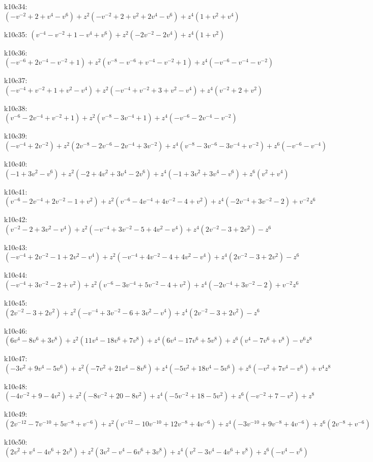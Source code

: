 k10c34: $ (-v^{-2}+2+v^{4}-v^{6})  +z^{2}(-v^{-2}+2+v^{2}+2v^{4}-v^{6})  +z^{4}(1+v^{2}+v^{4}) $ 

k10c35: $ (v^{-4}-v^{-2}+1-v^{4}+v^{6})  +z^{2}(-2v^{-2}-2v^{4})  +z^{4}(1+v^{2}) $ 

k10c36: $ (-v^{-6}+2v^{-4}-v^{-2}+1)  +z^{2}(v^{-8}-v^{-6}+v^{-4}-v^{-2}+1)  +z^{4}(-v^{-6}-v^{-4}-v^{-2}) $ 

k10c37: $ (-v^{-4}+v^{-2}+1+v^{2}-v^{4})  +z^{2}(-v^{-4}+v^{-2}+3+v^{2}-v^{4})  +z^{4}(v^{-2}+2+v^{2}) $ 

k10c38: $ (v^{-6}-2v^{-4}+v^{-2}+1)  +z^{2}(v^{-8}-3v^{-4}+1)  +z^{4}(-v^{-6}-2v^{-4}-v^{-2}) $ 

k10c39: $ (-v^{-4}+2v^{-2})  +z^{2}(2v^{-8}-2v^{-6}-2v^{-4}+3v^{-2})  +z^{4}(v^{-8}-3v^{-6}-3v^{-4}+v^{-2})  +z^{6}(-v^{-6}-v^{-4}) $ 

k10c40: $ (-1+3v^{2}-v^{6})  +z^{2}(-2+4v^{2}+3v^{4}-2v^{6})  +z^{4}(-1+3v^{2}+3v^{4}-v^{6})  +z^{6}(v^{2}+v^{4}) $ 

k10c41: $ (v^{-6}-2v^{-4}+2v^{-2}-1+v^{2})  +z^{2}(v^{-6}-4v^{-4}+4v^{-2}-4+v^{2})  +z^{4}(-2v^{-4}+3v^{-2}-2)  +v^{-2}z^{6} $ 

k10c42: $ (v^{-2}-2+3v^{2}-v^{4})  +z^{2}(-v^{-4}+3v^{-2}-5+4v^{2}-v^{4})  +z^{4}(2v^{-2}-3+2v^{2})  -z^{6} $ 

k10c43: $ (-v^{-4}+2v^{-2}-1+2v^{2}-v^{4})  +z^{2}(-v^{-4}+4v^{-2}-4+4v^{2}-v^{4})  +z^{4}(2v^{-2}-3+2v^{2})  -z^{6} $ 

k10c44: $ (-v^{-4}+3v^{-2}-2+v^{2})  +z^{2}(v^{-6}-3v^{-4}+5v^{-2}-4+v^{2})  +z^{4}(-2v^{-4}+3v^{-2}-2)  +v^{-2}z^{6} $ 

k10c45: $ (2v^{-2}-3+2v^{2})  +z^{2}(-v^{-4}+3v^{-2}-6+3v^{2}-v^{4})  +z^{4}(2v^{-2}-3+2v^{2})  -z^{6} $ 

k10c46: $ (6v^{4}-8v^{6}+3v^{8})  +z^{2}(11v^{4}-18v^{6}+7v^{8})  +z^{4}(6v^{4}-17v^{6}+5v^{8})  +z^{6}(v^{4}-7v^{6}+v^{8})  -v^{6}z^{8} $ 

k10c47: $ (-3v^{2}+9v^{4}-5v^{6})  +z^{2}(-7v^{2}+21v^{4}-8v^{6})  +z^{4}(-5v^{2}+18v^{4}-5v^{6})  +z^{6}(-v^{2}+7v^{4}-v^{6})  +v^{4}z^{8} $ 

k10c48: $ (-4v^{-2}+9-4v^{2})  +z^{2}(-8v^{-2}+20-8v^{2})  +z^{4}(-5v^{-2}+18-5v^{2})  +z^{6}(-v^{-2}+7-v^{2})  +z^{8} $ 

k10c49: $ (2v^{-12}-7v^{-10}+5v^{-8}+v^{-6})  +z^{2}(v^{-12}-10v^{-10}+12v^{-8}+4v^{-6})  +z^{4}(-3v^{-10}+9v^{-8}+4v^{-6})  +z^{6}(2v^{-8}+v^{-6}) $ 

k10c50: $ (2v^{2}+v^{4}-4v^{6}+2v^{8})  +z^{2}(3v^{2}-v^{4}-6v^{6}+3v^{8})  +z^{4}(v^{2}-3v^{4}-4v^{6}+v^{8})  +z^{6}(-v^{4}-v^{6}) $ 

